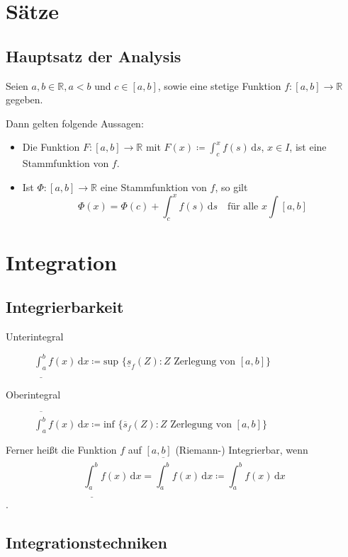 	\section{Sätze}
		\subsection{Hauptsatz der Analysis}
			Seien $ a, b \in \mathbb{R}, a < b $ und $ c \in [a, b] $, sowie eine stetige Funktion $ f : [a, b] \rightarrow \mathbb{R} $ gegeben.

			Dann gelten folgende Aussagen:
			\begin{itemize}
				\item Die Funktion $ F : [a, b] \rightarrow \mathbb{R} $ mit $ F(x) \coloneqq \int _ c ^ x \! f(s) \, \mathrm{d}s $, $ x \in I $, ist eine Stammfunktion von $ f $.
				\item Ist $ \Phi : [a, b] \rightarrow \mathbb{R} $ eine Stammfunktion von $ f $, so gilt \[ \Phi(x) = \Phi(c) + \int _ c ^ x \! f(s) \, \mathrm{d}s \quad\text{für alle } x \int [a, b] \]
			\end{itemize}

	\section{Integration}
		\subsection{Integrierbarkeit}
			\begin{description}
				\item[Unterintegral] $ \underline{\int _ a ^ b} \! f(x) \, \mathrm{d}x \coloneqq \text{sup } \{ \underline{s} _ f (Z) : Z \text{ Zerlegung von } [a, b] \} $
				\item[Oberintegral] $ \overline{\int _ a ^ b} \! f(x) \, \mathrm{d}x \coloneqq \text{inf } \{ \overline{s} _ f (Z) : Z \text{ Zerlegung von } [a, b] \} $
			\end{description}

			Ferner heißt die Funktion $ f $ auf $ [a, b] $ (Riemann-) Integrierbar, wenn \[ \underline{\int _ a ^ b} \! f(x) \, \mathrm{d}x = \overline{\int _ a ^ b} \! f(x) \, \mathrm{d}x \coloneqq \int _ a ^ b \! f(x) \, \mathrm{d}x \].

		\subsection{Integrationstechniken}
